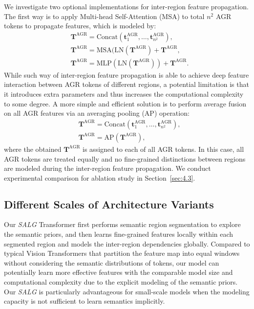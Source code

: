 We investigate two optional implementations for inter-region feature propagation. The first way is to apply Multi-head Self-Attention (MSA) to total $n^2$ AGR tokens to propagate features, which is modeled by:
\begin{equation}
    \begin{split}
    &\mathbf{T}^\text{AGR} = \text{Concat}(\mathbf{t}^\text{AGR}_1, \dots, \mathbf{t}^\text{AGR}_{n^2}), \\
    &\mathbf{T}^\text{AGR} = \text{MSA}(\mathrm{LN}(\mathbf{T}^\text{AGR})+\mathbf{T}^\text{AGR},\\
    &\mathbf{T}^\text{AGR} = \text{MLP}(\text{LN}(\mathbf{T}^\text{AGR}))+\mathbf{T}^\text{AGR}.
    \end{split}
    \label{eqn:agr-msa}
\end{equation}
While such way of inter-region feature propagation is able to achieve deep feature interaction between AGR tokens of different regions, a potential limitation is that it introduces extra parameters and thus increases the computational complexity to some degree. A more simple and efficient solution is to perform average fusion on all AGR features via an averaging pooling (AP) operation:
\begin{equation}
\begin{split}
&\mathbf{T}^\text{AGR} = \text{Concat}(\mathbf{t}^\text{AGR}_1, \dots, \mathbf{t}^\text{AGR}_{n^2}), \\
&\mathbf{T}^\text{AGR} = \text{AP}(\mathbf{T}^\text{AGR}),
\end{split}
\label{eqn:agr-avg}
\end{equation}
where the obtained $\mathbf{T}^\text{AGR}$ is assigned to each of all AGR tokens. In this case, all AGR tokens are treated equally and no fine-grained distinctions between regions are modeled during the inter-region feature propagation. We conduct experimental comparison for ablation study in Section~\ref{sec:4.3}.

\subsection{Different Scales of Architecture Variants}
\label{sec:3.4}
Our \emph{SALG} Transformer first performs semantic region segmentation to explore the semantic priors, and then learns fine-grained features locally within each segmented region and models the inter-region dependencies globally. Compared to typical Vision Transformers that partition the feature map into equal windows without considering the semantic distributions of tokens, our model can potentially learn more effective features with the comparable model size and computational complexity due to the explicit modeling of the semantic priors. Our \emph{SALG} is particularly advantageous for small-scale models when the modeling capacity is not sufficient to learn semantics implicitly. 

